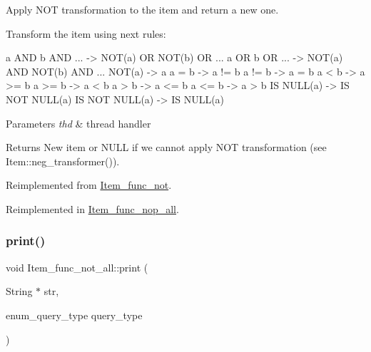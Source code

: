 Apply N\+OT transformation to the item and return a new one.

Transform the item using next rules\+: \begin{DoxyVerb}     a AND b AND ...    -> NOT(a) OR NOT(b) OR ...
     a OR b OR ...      -> NOT(a) AND NOT(b) AND ...
     NOT(a)             -> a
     a = b              -> a != b
     a != b             -> a = b
     a < b              -> a >= b
     a >= b             -> a < b
     a > b              -> a <= b
     a <= b             -> a > b
     IS NULL(a)         -> IS NOT NULL(a)
     IS NOT NULL(a)     -> IS NULL(a)\end{DoxyVerb}



\begin{DoxyParams}{Parameters}
{\em thd} & thread handler\\
\hline
\end{DoxyParams}
\begin{DoxyReturn}{Returns}
New item or N\+U\+LL if we cannot apply N\+OT transformation (see Item\+::neg\+\_\+transformer()). 
\end{DoxyReturn}


Reimplemented from \mbox{\hyperlink{classItem__func__not_abab1c235b067b74dda31f300a50104a4}{Item\+\_\+func\+\_\+not}}.



Reimplemented in \mbox{\hyperlink{classItem__func__nop__all_a6584dde63d69111ad332417b07883229}{Item\+\_\+func\+\_\+nop\+\_\+all}}.

\mbox{\label{classItem__func__not__all_add67ca3249a9c4b6b68e6a6d0fcdd411}} 
\subsubsection{\texorpdfstring{print()}{print()}}
{\footnotesize\ttfamily void Item\+\_\+func\+\_\+not\+\_\+all\+::print (\begin{DoxyParamCaption}\item[{String $\ast$}]{str,  }\item[{enum\+\_\+query\+\_\+type}]{query\+\_\+type }\end{DoxyParamCaption})\hspace{0.3cm}{\ttfamily [virtual]}}

